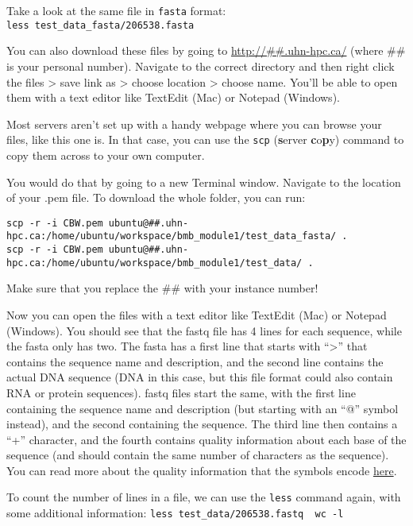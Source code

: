 \documentclass[
]{book}
\begin{document}
Take a look at the same file in \texttt{fasta} format: \texttt{less\ test\_data\_fasta/206538.fasta}

You can also download these files by going to \url{http://\#\#.uhn-hpc.ca/} (where \#\# is your personal number). Navigate to the correct directory and then right click the files \textgreater{} save link as \textgreater{} choose location \textgreater{} choose name. You'll be able to open them with a text editor like TextEdit (Mac) or Notepad (Windows).

Most servers aren't set up with a handy webpage where you can browse your files, like this one is. In that case, you can use the \texttt{scp} (\textbf{s}erver \textbf{c}o\textbf{p}y) command to copy them across to your own computer.

You would do that by going to a new Terminal window. Navigate to the location of your .pem file. To download the whole folder, you can run:

\begin{verbatim}
scp -r -i CBW.pem ubuntu@##.uhn-hpc.ca:/home/ubuntu/workspace/bmb_module1/test_data_fasta/ .
scp -r -i CBW.pem ubuntu@##.uhn-hpc.ca:/home/ubuntu/workspace/bmb_module1/test_data/ .
\end{verbatim}

Make sure that you replace the \#\# with your instance number!

Now you can open the files with a text editor like TextEdit (Mac) or Notepad (Windows).
You should see that the fastq file has 4 lines for each sequence, while the fasta only has two. The fasta has a first line that starts with ``\textgreater{}'' that contains the sequence name and description, and the second line contains the actual DNA sequence (DNA in this case, but this file format could also contain RNA or protein sequences). fastq files start the same, with the first line containing the sequence name and description (but starting with an ``@'' symbol instead), and the second containing the sequence. The third line then contains a ``+'' character, and the fourth contains quality information about each base of the sequence (and should contain the same number of characters as the sequence). You can read more about the quality information that the symbols encode \href{https://en.wikipedia.org/wiki/FASTQ_format}{here}.

To count the number of lines in a file, we can use the \texttt{less} command again, with some additional information: \texttt{less\ test\_data/206538.fastq\ \textbar{}\ wc\ -l}
\end{document}
